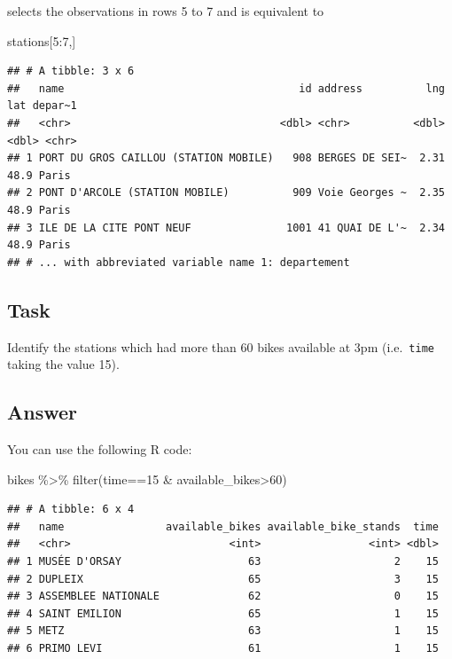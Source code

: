 \documentclass[
]{book}
\newenvironment{Shaded}{\begin{snugshade}}{\end{snugshade}}
\newcommand{\DecValTok}[1]{\textcolor[rgb]{0.00,0.00,0.81}{#1}}
\newcommand{\FunctionTok}[1]{\textcolor[rgb]{0.00,0.00,0.00}{#1}}
\newcommand{\NormalTok}[1]{#1}
\newcommand{\SpecialCharTok}[1]{\textcolor[rgb]{0.00,0.00,0.00}{#1}}
\begin{document}
selects the observations in rows 5 to 7 and is equivalent to

\begin{Shaded}
\begin{Highlighting}[]
\NormalTok{stations[}\DecValTok{5}\SpecialCharTok{:}\DecValTok{7}\NormalTok{,]}
\end{Highlighting}
\end{Shaded}

\begin{verbatim}
## # A tibble: 3 x 6
##   name                                     id address          lng   lat depar~1
##   <chr>                                 <dbl> <chr>          <dbl> <dbl> <chr>  
## 1 PORT DU GROS CAILLOU (STATION MOBILE)   908 BERGES DE SEI~  2.31  48.9 Paris  
## 2 PONT D'ARCOLE (STATION MOBILE)          909 Voie Georges ~  2.35  48.9 Paris  
## 3 ILE DE LA CITE PONT NEUF               1001 41 QUAI DE L'~  2.34  48.9 Paris  
## # ... with abbreviated variable name 1: departement
\end{verbatim}

\hypertarget{task-3}{%
\subsection{Task}\label{task-3}}

Identify the stations which had more than 60 bikes available at 3pm (i.e.~\texttt{time} taking the value 15).

\hypertarget{answer-2}{%
\subsection{Answer}\label{answer-2}}

You can use the following R code:

\begin{Shaded}
\begin{Highlighting}[]
\NormalTok{bikes }\SpecialCharTok{\%\textgreater{}\%}
  \FunctionTok{filter}\NormalTok{(time}\SpecialCharTok{==}\DecValTok{15} \SpecialCharTok{\&}\NormalTok{ available\_bikes}\SpecialCharTok{\textgreater{}}\DecValTok{60}\NormalTok{)}
\end{Highlighting}
\end{Shaded}

\begin{verbatim}
## # A tibble: 6 x 4
##   name                available_bikes available_bike_stands  time
##   <chr>                         <int>                 <int> <dbl>
## 1 MUSÉE D'ORSAY                    63                     2    15
## 2 DUPLEIX                          65                     3    15
## 3 ASSEMBLEE NATIONALE              62                     0    15
## 4 SAINT EMILION                    65                     1    15
## 5 METZ                             63                     1    15
## 6 PRIMO LEVI                       61                     1    15
\end{verbatim}
\end{document}
